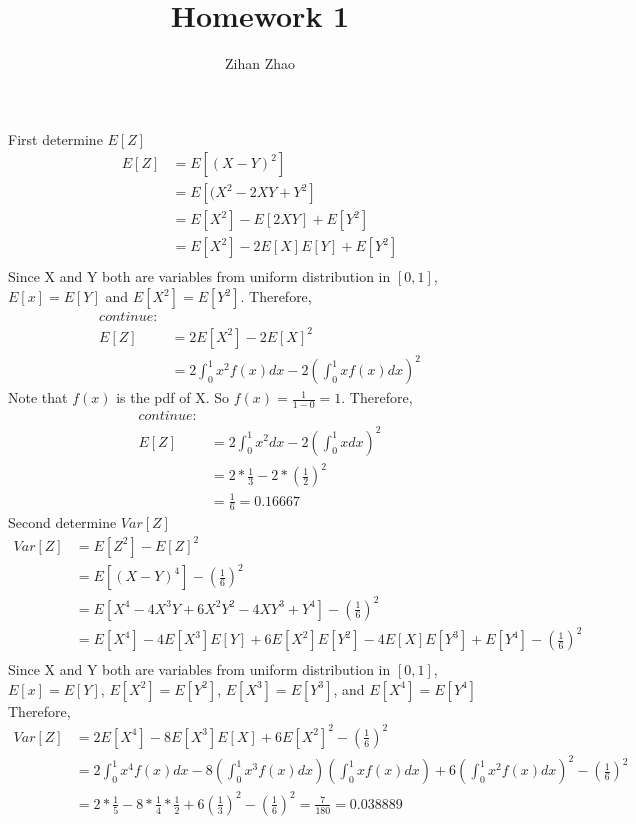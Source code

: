 \documentclass{article}
\author{Zihan Zhao}
\affil{1001103708}
\title{Homework 1}
\date{}
\begin{document}
\maketitle
\section{}
\renewcommand{\thesubsection}{(\alph{subsection})}
\subsection{}
First determine $E[Z]$
\begin{align*}
  E[Z] &= E[(X-Y)^2]\\
  &= E[(X^2 - 2XY + Y^2]\\
  &= E[X^2] - E[2XY] + E[Y^2]\\
  &= E[X^2] - 2E[X]E[Y] + E[Y^2]\\
\end{align*}
Since X and Y both are variables from uniform distribution in $[0,1]$, $E[x] = E[Y]$ and $E[X^2] = E[Y^2]$. Therefore,
\begin{align*}
    continue:\\
    E[Z] &= 2E[X^2] - 2E[X]^2\\
    &= 2\int^1_0 x^2f(x)dx - 2(\int^1_0 xf(x)dx)^2
\end{align*}
Note that $f(x)$ is the pdf of X. So $f(x) = \frac{1}{1-0} = 1$. Therefore,
\begin{align*}
    continue:\\
    E[Z] &= 2\int^1_0 x^2dx - 2(\int^1_0 xdx)^2\\
    &= 2*\frac{1}{3} - 2*(\frac{1}{2})^2\\
    &= \frac{1}{6} = 0.16667
\end{align*}
Second determine $Var[Z]$
\begin{align*}
    Var[Z] &= E[Z^2]-E[Z]^2\\
    &= E[(X-Y)^4]-(\frac{1}{6})^2\\
    &= E[X^4-4X^3Y+6X^2Y^2-4XY^3+Y^4]-(\frac{1}{6})^2\\
    &= E[X^4]-4E[X^3]E[Y]+6E[X^2]E[Y^2]-4E[X]E[Y^3]+E[Y^4]-(\frac{1}{6})^2\\
\end{align*}
Since X and Y both are variables from uniform distribution in $[0,1]$, $E[x] = E[Y]$, $E[X^2] = E[Y^2]$, $E[X^3] = E[Y^3]$, and $E[X^4] = E[Y^4]$ Therefore,
\begin{align*}
    Var[Z] &= 2E[X^4]-8E[X^3]E[X]+6E[X^2]^2-(\frac{1}{6})^2\\
    &= 2\int^1_0 x^4f(x)dx - 8(\int^1_0 x^3f(x)dx)(\int^1_0 xf(x)dx) + 6(\int^1_0 x^2f(x)dx)^2-(\frac{1}{6})^2\\
    &= 2*\frac{1}{5} - 8*\frac{1}{4}*\frac{1}{2} + 6(\frac{1}{3})^2-(\frac{1}{6})^2=\frac{7}{180}=0.038889
\end{align*}
\end{document}
